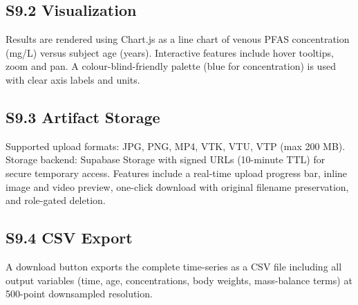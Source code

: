 \documentclass[12pt]{article}
\begin{document}
\subsection*{S9.2 Visualization}

Results are rendered using Chart.js as a line chart of venous PFAS
concentration (mg/L) versus subject age (years). Interactive features
include hover tooltips, zoom and pan. A colour-blind-friendly palette
(blue for concentration) is used with clear axis labels and units.

\subsection*{S9.3 Artifact Storage}

Supported upload formats: JPG, PNG, MP4, VTK, VTU, VTP (max 200 MB).
Storage backend: Supabase Storage with signed URLs (10-minute TTL)
for secure temporary access. Features include a real-time upload
progress bar, inline image and video preview, one-click download with
original filename preservation, and role-gated deletion.

\subsection*{S9.4 CSV Export}

A download button exports the complete time-series as a CSV file
including all output variables (time, age, concentrations, body
weights, mass-balance terms) at 500-point downsampled resolution.
\end{document}
